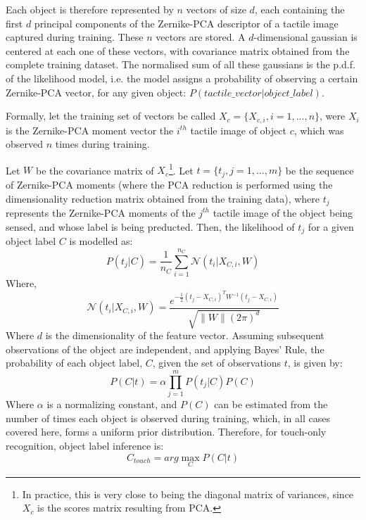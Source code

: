 \documentclass[9pt,technote]{IEEEtran}  %
\begin{document}
Each object is therefore represented by $n$ vectors of size $d$, each containing the first $d$ principal components of the Zernike-PCA descriptor of a tactile image captured during training. These $n$ vectors are stored. A $d$-dimensional gaussian is centered at each one of these vectors, with covariance matrix obtained from the complete training dataset. The normalised sum of all these gaussians is the p.d.f. of the likelihood model, i.e. the model assigns a probability of observing a certain Zernike-PCA vector, for any given object: $P(tactile\_vector|object\_label)$.

Formally, let the training set of vectors be called $X_c = \{X_{c,i}, i=1,...,n\}$, were $X_i$ is the Zernike-PCA moment vector the $i^{th}$ tactile image of object $c$, which was observed $n$ times during training. 

Let $W$ be the covariance matrix of $X_c$\footnote{In practice, this is very close to being the diagonal matrix of variances, since $X_c$ is the scores matrix resulting from PCA.}. Let $t = \{t_j, j = 1,...,m\}$ be the sequence of Zernike-PCA moments (where the PCA reduction is performed using the dimensionality reduction matrix obtained from the training data), where $t_j$ represents the Zernike-PCA moments of the $j^{th}$ tactile image of the object being sensed, and whose label is being preducted. Then, the likelihood of $t_j$ for a given object label $C$ is modelled as:
$$
P(t_j | C) = \frac{1}{n_C}\sum_{i=1}^{n_C}\mathcal{N}(t_i | X_{C,i}, W)
$$
Where,
$$
\mathcal{N}(t_i | X_{C,i}, W) =  \frac{e^{-\frac{1}{2}(t_j-X_{C,i})^TW^{-1}(t_j-X_{C,i})}}{\sqrt{\|W\|(2\pi)^d}}
$$
Where $d$ is the dimensionality of the feature vector. Assuming subsequent observations of the object are independent, and applying Bayes' Rule, the probability of each object label, $C$, given the set of observations $t$, is given by:
\begin{equation}
P(C | t) = \alpha\prod_{j=1}^{m} P(t_j | C) P(C)
\label{eqn_pct}
\end{equation}
Where $\alpha$ is a normalizing constant, and $P(C)$ can be estimated from the number of times each object is observed during training, which, in all cases covered here, forms a uniform prior distribution. Therefore, for touch-only recognition, object label inference is:
\begin{equation}
C_{touch} = arg \max_{C} P(C|t)
\label{eqn_ctouch}
\end{equation}
\end{document}
